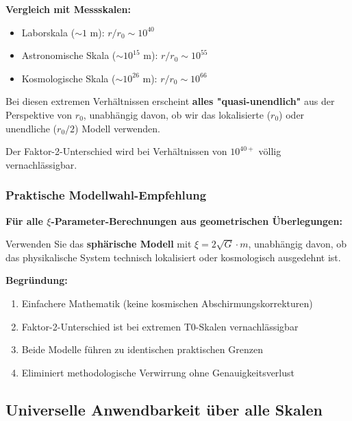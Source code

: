 \documentclass[12pt,a4paper]{article}
\begin{document}
\textbf{Vergleich mit Messskalen:}
\begin{itemize}
	\item Laborskala ($\sim 1$ m): $r/r_0 \sim 10^{40}$
	\item Astronomische Skala ($\sim 10^{15}$ m): $r/r_0 \sim 10^{55}$
	\item Kosmologische Skala ($\sim 10^{26}$ m): $r/r_0 \sim 10^{66}$
\end{itemize}

\begin{tcolorbox}[colback=blue!5!white,colframe=blue!75!black,title=Skalenhierarchie-Einsicht]
	Bei diesen extremen Verhältnissen erscheint \textbf{alles "quasi-unendlich"} aus der Perspektive von $r_0$, unabhängig davon, ob wir das lokalisierte ($r_0$) oder unendliche ($r_0/2$) Modell verwenden.
	
	Der Faktor-2-Unterschied wird bei Verhältnissen von $10^{40+}$ völlig vernachlässigbar.
\end{tcolorbox}

\subsubsection{Praktische Modellwahl-Empfehlung}  
\label{subsubsec:model_choice_recommendation}

\begin{tcolorbox}[colback=green!5!white,colframe=green!75!black,title=Praktische Empfehlung]
	\textbf{Für alle $\xi$-Parameter-Berechnungen aus geometrischen Überlegungen:}
	
	Verwenden Sie das \textbf{sphärische Modell} mit $\xi = 2\sqrt{G} \cdot m$, unabhängig davon, ob das physikalische System technisch lokalisiert oder kosmologisch ausgedehnt ist.
	
	\textbf{Begründung:}
	\begin{enumerate}
		\item Einfachere Mathematik (keine kosmischen Abschirmungskorrekturen)
		\item Faktor-2-Unterschied ist bei extremen T0-Skalen vernachlässigbar  
		\item Beide Modelle führen zu identischen praktischen Grenzen
		\item Eliminiert methodologische Verwirrung ohne Genauigkeitsverlust
	\end{enumerate}
\end{tcolorbox}

\subsection{Universelle Anwendbarkeit über alle Skalen}
\label{subsec:universal_applicability}
\end{document}
